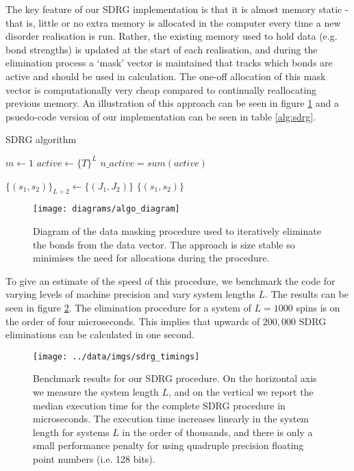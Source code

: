The key feature of our SDRG implementation is that it is almost memory static - that is, little or no extra memory is allocated in the computer every time a new disorder realisation is run. Rather, the existing memory used to hold data (e.g. bond strengths) is updated at the start of each realisation, and during the elimination process a `mask' vector is maintained that tracks which bonds are active and should be used in calculation. The one-off allocation of this mask vector is computationally very cheap compared to continually reallocating previous memory. An illustration of this approach can be seen in figure \ref{fig:data_mask} and a psuedo-code version of our implementation can be seen in table \ref{alg:sdrg}. 
\begin{algorithm}
\caption{SDRG algorithm}\label{alg:sdrg}
$m \gets 1$\;
$active \gets \{T\}^L$\;
$n\_active = sum(active)$ 

$\{(s_1, s_2)\}_{L \div 2} \gets \{(J_1, J_2)\}$\;
\Return $\{(s_1, s_2)\}$\;

\end{algorithm}

\begin{figure}
	\centering
	\texttt{[image: diagrams/algo\_diagram]}
	\caption{Diagram of the data masking procedure used to iteratively eliminate the bonds from the data vector. The approach is size stable so minimises the need for allocations during the procedure.}
	\label{fig:data_mask}
\end{figure}

To give an estimate of the speed of this procedure, we benchmark the code for varying levels of machine precision and vary system lengths $L$. The results can be seen in figure \ref{fig:sdrg_performance}. The elimination procedure for a system of $L = 1000$ spins is on the order of four microseconds. This implies that upwards of $200,000$ SDRG eliminations can be calculated in one second.

\begin{figure}
	\centering
	\texttt{[image: ../data/imgs/sdrg\_timings]}
	\caption{Benchmark results for our SDRG procedure. On the horizontal axis we measure the system length $L$, and on the vertical we report the median execution time for the complete SDRG procedure in microseconds. The execution time increases linearly in the system length for systems $L$ in the order of thousands, and there is only a small performance penalty for using quadruple precision floating point numbers (i.e. 128 bits).}
	\label{fig:sdrg_performance}
\end{figure}

